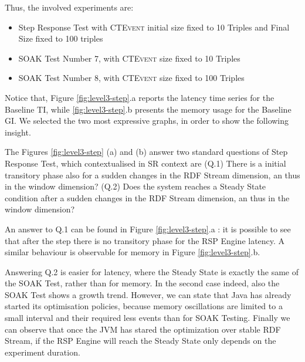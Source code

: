 Thus, the involved experiments are:

\begin{itemize}
\item Step Response Test with \textsc{CTEvent} initial size fixed to 10 Triples and Final Size fixed to 100 triples
\item SOAK Test Number 7, with \textsc{CTEvent} size fixed to 10 Triples
\item SOAK Test Number 8, with \textsc{CTEvent} size fixed to 100 Triples
\end{itemize}

Notice that, Figure \ref{fig:level3-step}.a reports the latency time series for the Baseline TI, while \ref{fig:level3-step}.b presents the memory usage for the Baseline GI. We selected the two most expressive graphs, in order to show the following insight.

The Figures \ref{fig:level3-step} (a) and (b) answer two standard questions of Step Response Test, which contextualised in SR context are (Q.1) There is a initial transitory phase also for a sudden changes in the RDF Stream dimension, an thus in the window dimension? (Q.2) Does the system reaches a Steady State condition after a sudden changes in the RDF Stream dimension, an thus in the window dimension?

An answer to Q.1 can be found in Figure \ref{fig:level3-step}.a : it is possible to see that after the step there is no transitory phase for the RSP Engine latency. A similar behaviour is observable for memory in Figure \ref{fig:level3-step}.b. 

Answering Q.2 is easier for latency, where the Steady State is exactly the same of the SOAK Test, rather than for memory. In the second case indeed, also the SOAK Test shows a growth trend. However, we can state that Java has already started its optimisation policies, because memory oscillations are limited to a small interval and their required less events than for SOAK Testing. Finally we can observe that once the JVM has stared the optimization over stable RDF Stream, if the RSP Engine will reach the Steady State only depends on the experiment duration.


